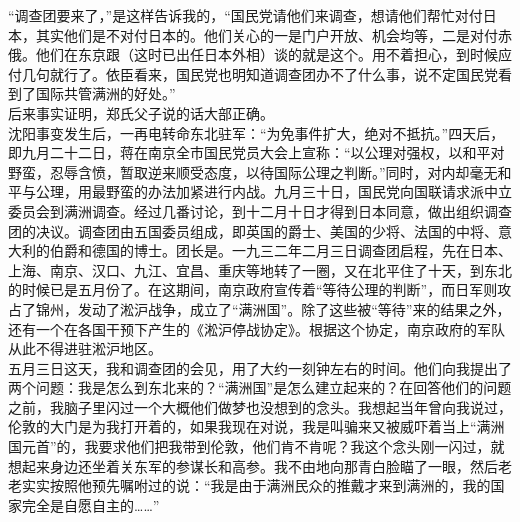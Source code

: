 “调查团要来了，”是这样告诉我的，“国民党请他们来调查，想请他们帮忙对付日本，其实他们是不对付日本的。他们关心的一是门户开放、机会均等，二是对付赤俄。他们在东京跟（这时已出任日本外相）谈的就是这个。用不着担心，到时候应付几句就行了。依臣看来，国民党也明知道调查团办不了什么事，说不定国民党看到了国际共管满洲的好处。”\\

后来事实证明，郑氏父子说的话大部正确。\\

沈阳事变发生后，一再电转命东北驻军：“为免事件扩大，绝对不抵抗。”四天后，即九月二十二日，蒋在南京全市国民党员大会上宣称：“以公理对强权，以和平对野蛮，忍辱含愤，暂取逆来顺受态度，以待国际公理之判断。”同时，对内却毫无和平与公理，用最野蛮的办法加紧进行内战。九月三十日，国民党向国联请求派中立委员会到满洲调查。经过几番讨论，到十二月十日才得到日本同意，做出组织调查团的决议。调查团由五国委员组成，即英国的爵士、美国的少将、法国的中将、意大利的伯爵和德国的博士。团长是。一九三二年二月三日调查团启程，先在日本、上海、南京、汉口、九江、宜昌、重庆等地转了一圈，又在北平住了十天，到东北的时候已是五月份了。在这期间，南京政府宣传着“等待公理的判断”，而日军则攻占了锦州，发动了淞沪战争，成立了“满洲国”。除了这些被“等待”来的结果之外，还有一个在各国干预下产生的《淞沪停战协定》。根据这个协定，南京政府的军队从此不得进驻淞沪地区。\\

五月三日这天，我和调查团的会见，用了大约一刻钟左右的时间。他们向我提出了两个问题：我是怎么到东北来的？“满洲国”是怎么建立起来的？在回答他们的问题之前，我脑子里闪过一个大概他们做梦也没想到的念头。我想起当年曾向我说过，伦敦的大门是为我打开着的，如果我现在对说，我是叫骗来又被威吓着当上“满洲国元首”的，我要求他们把我带到伦敦，他们肯不肯呢？我这个念头刚一闪过，就想起来身边还坐着关东军的参谋长和高参。我不由地向那青白脸瞄了一眼，然后老老实实按照他预先嘱咐过的说：“我是由于满洲民众的推戴才来到满洲的，我的国家完全是自愿自主的……”\\

